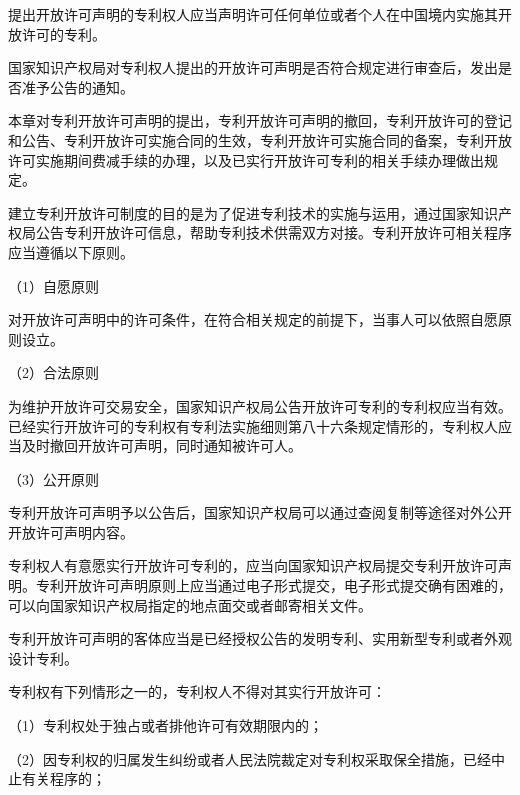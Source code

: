 提出开放许可声明的专利权人应当声明许可任何单位或者个人在中国境内实施其开放许可的专利。

国家知识产权局对专利权人提出的开放许可声明是否符合规定进行审查后，发出是否准予公告的通知。

本章对专利开放许可声明的提出，专利开放许可声明的撤回，专利开放许可的登记和公告、专利开放许可实施合同的生效，专利开放许可实施合同的备案，专利开放许可实施期间费减手续的办理，以及已实行开放许可专利的相关手续办理做出规定。

建立专利开放许可制度的目的是为了促进专利技术的实施与运用，通过国家知识产权局公告专利开放许可信息，帮助专利技术供需双方对接。专利开放许可相关程序应当遵循以下原则。

{\setlength{\parindent}{17.1bp}（1）自愿原则\par}

对开放许可声明中的许可条件，在符合相关规定的前提下，当事人可以依照自愿原则设立。

{\setlength{\parindent}{17.1bp}（2）合法原则\par}

为维护开放许可交易安全，国家知识产权局公告开放许可专利的专利权应当有效。已经实行开放许可的专利权有专利法实施细则第八十六条规定情形的，专利权人应当及时撤回开放许可声明，同时通知被许可人。

{\setlength{\parindent}{17.1bp}（3）公开原则\par}

专利开放许可声明予以公告后，国家知识产权局可以通过查阅复制等途径对外公开开放许可声明内容。

专利权人有意愿实行开放许可专利的，应当向国家知识产权局提交专利开放许可声明。专利开放许可声明原则上应当通过电子形式提交，电子形式提交确有困难的，可以向国家知识产权局指定的地点面交或者邮寄相关文件。

专利开放许可声明的客体应当是已经授权公告的发明专利、实用新型专利或者外观设计专利。

专利权有下列情形之一的，专利权人不得对其实行开放许可：

{\setlength{\parindent}{17.1bp}（1）专利权处于独占或者排他许可有效期限内的；\par}

{\setlength{\parindent}{17.1bp}（2）因专利权的归属发生纠纷或者人民法院裁定对专利权采取保全措施，已经中止有关程序的；\par}

